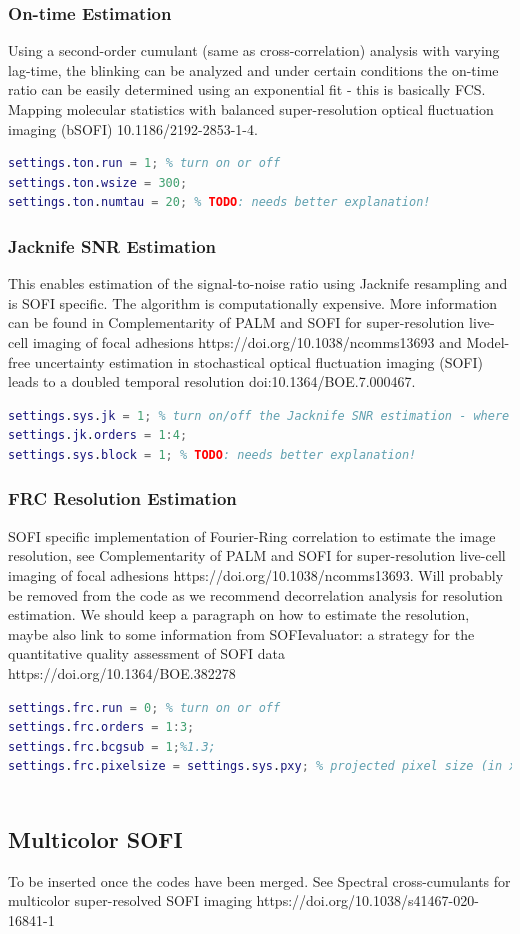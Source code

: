 \documentclass[final]{scrartcl}
\begin{document}
\subsubsection*{On-time Estimation}
Using a second-order cumulant (same as cross-correlation) analysis with varying lag-time, the blinking can be analyzed and under certain conditions the on-time ratio can be easily determined using an exponential fit - this is basically FCS. Mapping molecular statistics with balanced super-resolution optical fluctuation imaging (bSOFI) 10.1186/2192-2853-1-4.
\begin{lstlisting}[language=Matlab]
% Estimate Ton
settings.ton.run = 1; % turn on or off
settings.ton.wsize = 300;
settings.ton.numtau = 20; % TODO: needs better explanation!
\end{lstlisting}

\subsubsection*{Jacknife SNR Estimation}
This enables estimation of the signal-to-noise ratio using Jacknife resampling and is SOFI specific. The algorithm is computationally expensive. More information can be found in Complementarity of PALM and SOFI for super-resolution live-cell imaging of focal adhesions https://doi.org/10.1038/ncomms13693 and Model-free uncertainty estimation in stochastical optical fluctuation imaging (SOFI) leads to a doubled temporal resolution doi:10.1364/BOE.7.000467.
\begin{lstlisting}[language=Matlab]
% Jacknife SNR estimation
settings.sys.jk = 1; % turn on/off the Jacknife SNR estimation - where is it in the code?
settings.jk.orders = 1:4;
settings.sys.block = 1; % TODO: needs better explanation!
\end{lstlisting}

\subsubsection*{FRC Resolution Estimation}
SOFI specific implementation of Fourier-Ring correlation to estimate the image resolution, see Complementarity of PALM and SOFI for super-resolution live-cell imaging of focal adhesions https://doi.org/10.1038/ncomms13693. Will probably be removed from the code as we recommend decorrelation analysis for resolution estimation. We should keep a paragraph on how to estimate the resolution, maybe also link to some information from SOFIevaluator: a strategy for the quantitative quality assessment of SOFI data https://doi.org/10.1364/BOE.382278
\begin{lstlisting}[language=Matlab]
% FRC calculation
settings.frc.run = 0; % turn on or off
settings.frc.orders = 1:3;
settings.frc.bcgsub = 1;%1.3;
settings.frc.pixelsize = settings.sys.pxy; % projected pixel size (in xy) [nm]  sofisetup = 96.0384, Hendriksetup = 104.8, AD-gut setup = 108
    
\end{lstlisting}

\subsection{Multicolor SOFI}
To be inserted once the codes have been merged. See Spectral cross-cumulants for multicolor super-resolved SOFI imaging https://doi.org/10.1038/s41467-020-16841-1  
\end{document}
